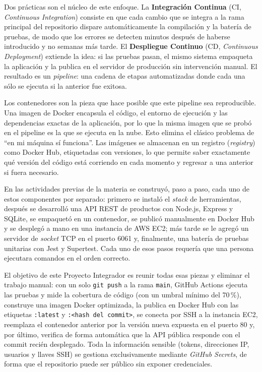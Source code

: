 \documentclass[12pt,letterpaper]{article}
\begin{document}
Dos prácticas son el núcleo de este enfoque. La \textbf{Integración Continua} (CI, \textit{Continuous Integration}) consiste en que cada cambio que se integra a la rama principal del repositorio dispare automáticamente la compilación y la batería de pruebas, de modo que los errores se detecten minutos después de haberse introducido y no semanas más tarde. El \textbf{Despliegue Continuo} (CD, \textit{Continuous Deployment}) extiende la idea: si las pruebas pasan, el mismo sistema empaqueta la aplicación y la publica en el servidor de producción sin intervención manual. El resultado es un \textit{pipeline}: una cadena de etapas automatizadas donde cada una sólo se ejecuta si la anterior fue exitosa.

Los contenedores son la pieza que hace posible que este pipeline sea reproducible. Una imagen de Docker encapsula el código, el entorno de ejecución y las dependencias exactas de la aplicación, por lo que la misma imagen que se probó en el pipeline es la que se ejecuta en la nube. Esto elimina el clásico problema de “en mi máquina sí funciona”. Las imágenes se almacenan en un registro (\textit{registry}) como Docker Hub, etiquetadas con versiones, lo que permite saber exactamente qué versión del código está corriendo en cada momento y regresar a una anterior si fuera necesario.

En las actividades previas de la materia se construyó, paso a paso, cada uno de estos componentes por separado: primero se instaló el \textit{stack} de herramientas, después se desarrolló una API REST de productos con Node.js, Express y SQLite, se empaquetó en un contenedor, se publicó manualmente en Docker Hub y se desplegó a mano en una instancia de AWS EC2; más tarde se le agregó un servidor de \textit{socket} TCP en el puerto 6061 y, finalmente, una batería de pruebas unitarias con Jest y Supertest. Cada uno de esos pasos requería que una persona ejecutara comandos en el orden correcto.

El objetivo de este Proyecto Integrador es reunir todas esas piezas y eliminar el trabajo manual: con un solo \texttt{git push} a la rama \texttt{main}, GitHub Actions ejecuta las pruebas y mide la cobertura de código (con un umbral mínimo del 70\,\%), construye una imagen Docker optimizada, la publica en Docker Hub con las etiquetas \texttt{:latest} y \texttt{:<hash del commit>}, se conecta por SSH a la instancia EC2, reemplaza el contenedor anterior por la versión nueva expuesta en el puerto 80 y, por último, verifica de forma automática que la API pública responde con el commit recién desplegado. Toda la información sensible (tokens, direcciones IP, usuarios y llaves SSH) se gestiona exclusivamente mediante \textit{GitHub Secrets}, de forma que el repositorio puede ser público sin exponer credenciales.
\end{document}
